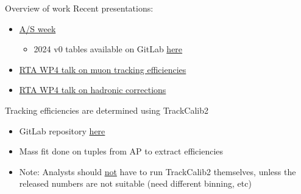 \documentclass[xcolor={dvipsnames}]{beamer}
\begin{document}
\begin{frame}{Overview of work}
  \vspace{0.0cm}
  {Recent presentations:}
  \vspace{0.2cm}
  \begin{itemize}
    \setlength\itemsep{0.5em}
    \item{\href{https://indico.cern.ch/event/1675248/\#80-trackcalib-for-run-3}{A/S week}}
    \begin{itemize}
      \item[-]{2024 v0 tables available on GitLab \href{https://gitlab.cern.ch/lhcb-rta/tracking-efficiencies-run-3}{here}}
    \end{itemize}
    \item{\href{https://indico.cern.ch/event/1577595/\#4-update-track-reconstruction}{RTA WP4 talk on muon tracking efficiencies}}
    \item{\href{https://indico.cern.ch/event/1577599/\#3-hadronic-tracking-uncertaint}{RTA WP4 talk on hadronic corrections}}
  \end{itemize}
  \vspace{0.5cm}
  {Tracking efficiencies are determined using TrackCalib2}
  \vspace{0.2cm}
  \begin{itemize}
    \setlength\itemsep{0.5em}
    \item{GitLab repository \href{https://gitlab.cern.ch/lhcb-rta/trackcalib2}{here}}
    \item{Mass fit done on tuples from AP to extract efficiencies}
    \item{Note: Analysts should \underline{not} have to run TrackCalib2 themselves, unless the released numbers are not suitable (need different binning, etc)}
  \end{itemize}
\end{frame}
\end{document}
